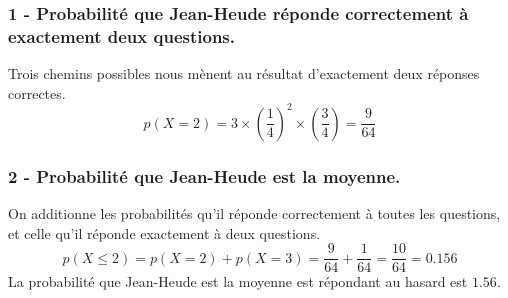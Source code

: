 \documentclass[11pt]{article}
\begin{document}
\begin{enumerate}
    \subsubsection*{1 - Probabilité que Jean-Heude réponde correctement à exactement deux questions.}
    Trois chemins possibles nous mènent au résultat d'exactement deux réponses correctes.
    $$p(X = 2) = 3 \times \left( \dfrac{1}{4} \right)^{2} \times \left( \dfrac{3}{4} \right) = \dfrac{9}{64}$$

    \subsubsection*{2 - Probabilité que Jean-Heude est la moyenne.}
    On additionne les probabilités qu'il réponde correctement à toutes les questions, et celle qu'il réponde exactement à deux questions.
    $$p(X \leq 2) = p(X = 2) + p(X = 3) = \dfrac{9}{64} + \dfrac{1}{64} = \dfrac{10}{64} = 0.156$$
    La probabilité que Jean-Heude est la moyenne est répondant au hasard est $1.56$.
  \end{enumerate}
\end{document}
